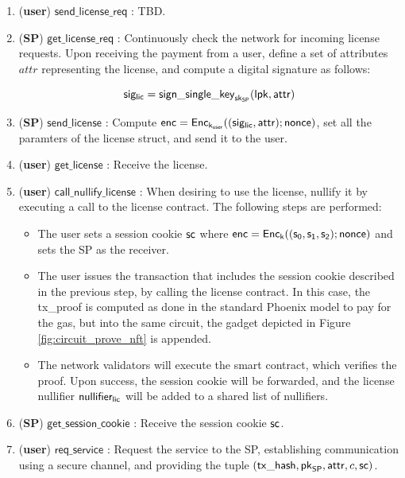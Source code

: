 \begin{enumerate}
	\item (\textbf{user}) $\mathsf{send\_license\_req}$ : TBD.

	\item (\textbf{SP}) $\mathsf{get\_license\_req}$ : Continuously check the network for incoming license requests. Upon receiving the payment from a user, define a set of attributes $attr$ representing the license, and compute a digital signature as follows:

	$$\mathsf{sig_{lic}} = \mathsf{sign\_single\_key}_{\mathsf{sk}_{\mathsf{SP}}}(\mathsf{lpk}, \mathsf{attr})$$

	\item (\textbf{SP}) $\mathsf{send\_license}$ : Compute $\mathsf{enc} = \mathsf{Enc}_{\mathsf{k}_{\mathsf{user}}} ((\mathsf{sig_{lic}}, \mathsf{attr}); \mathsf{nonce})$, set all the paramters of the license struct, and send it to the user.

	\item (\textbf{user}) $\mathsf{get\_license}$ : Receive the license. 

	\item (\textbf{user}) $\mathsf{call\_nullify\_license}$ : When desiring to use the license, nullify it by executing a call to the license contract. The following steps are performed:

	\begin{itemize}
		\item The user sets a session cookie $\mathsf{sc}$ where $\mathsf{enc} = \mathsf{Enc}_{\mathsf{k}} ((\mathsf{s_0}, \mathsf{s_1}, \mathsf{s_2}); \mathsf{nonce})$ and sets the SP as the receiver.
		\item The user issues the transaction that includes the session cookie described in the previous step, by calling the license contract. In this case, the \textsf{tx\_proof} is computed as done in the standard Phoenix model to pay for the gas, but into the same circuit, the gadget depicted in Figure \ref{fig:circuit_prove_nft} is appended.
		\item The network validators will execute the smart contract, which verifies the proof. Upon success, the session cookie will be forwarded, and the license nullifier $\mathsf{nullifier_{lic}}$ will be added to a shared list of nullifiers.
	\end{itemize}

	\item (\textbf{SP}) $\mathsf{get\_session\_cookie}$ : Receive the session cookie $\mathsf{sc}$.

	\item (\textbf{user}) $\mathsf{req\_service}$ : Request the service to the SP, establishing communication using a secure channel, and providing the tuple $(\mathsf{tx\_hash}, \mathsf{pk}_{\mathsf{SP}}, \mathsf{attr}, c, \mathsf{sc})$.


\end{enumerate}

